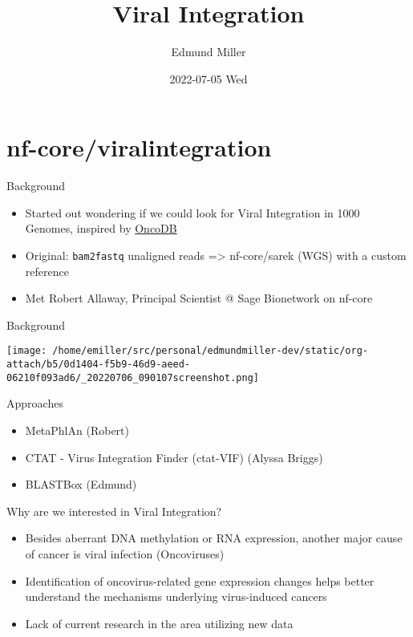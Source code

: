 \documentclass[bigger]{beamer}
\author{Edmund Miller}
\date{2022-07-05 Wed}
\title{Viral Integration}
\begin{document}
\maketitle

\section*{nf-core/viralintegration}
\label{sec:org64d2637}

\begin{frame}[label={sec:orgc70a8ad},fragile]{Background}
 \begin{itemize}
\item Started out wondering if we could look for Viral Integration in 1000 Genomes, inspired by \href{http://oncodb.org/}{OncoDB}
\item Original: \texttt{bam2fastq} unaligned reads => nf-core/sarek (WGS) with a custom
reference
\item Met Robert Allaway, Principal Scientist @ Sage Bionetwork on nf-core
\end{itemize}
\end{frame}

\begin{frame}[label={sec:org9ba87d7}]{Background}
\begin{center}
\texttt{[image: /home/emiller/src/personal/edmundmiller-dev/static/org-attach/b5/0d1404-f5b9-46d9-aeed-06210f093ad6/\_20220706\_090107screenshot.png]}
\end{center}
\end{frame}


\begin{frame}[label={sec:orgdc1a592}]{Approaches}
\begin{itemize}
\item MetaPhlAn (Robert)
\item CTAT - Virus Integration Finder (ctat-VIF) (Alyssa Briggs)
\item BLASTBox (Edmund)
\end{itemize}
\end{frame}

\begin{frame}[label={sec:org305094a}]{Why are we interested in Viral Integration?}
\begin{itemize}
\item Besides aberrant DNA methylation or RNA expression, another major cause of
cancer is viral infection (Oncoviruses)
\item Identification of oncovirus-related gene expression changes helps better
understand the mechanisms underlying virus-induced cancers
\item Lack of current research in the area utilizing new data
\end{itemize}
\end{frame}
\end{document}
